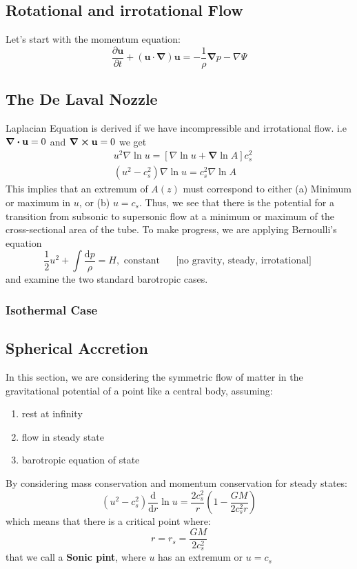 \documentclass[12pt,a4paper]{article}
\begin{document}
\subsection{Rotational and irrotational Flow}
Let's start with the momentum equation:
$$
\frac{\partial \mathbf{u}}{\partial t}+(\mathbf{u} \cdot \boldsymbol{\nabla}) \mathbf{u}=-\frac{1}{\rho} \boldsymbol{\nabla} p-\nabla \Psi
$$

\subsection{The De Laval Nozzle}
Laplacian Equation is derived if we have incompressible and irrotational flow. i.e $\div{\vb{u}=0}$ and $\curl{\vb{u}}=0$
we get $$
\begin{aligned}
& u^2 \nabla \ln u=[\nabla \ln u+\boldsymbol{\nabla} \ln A] c_s^2 \\
& \left(u^2-c_s^2\right) \nabla \ln u=c_s^2 \nabla \ln A
\end{aligned}
$$
This implies that an extremum of $A(z)$ must correspond to either
(a) Minimum or maximum in $u$, or
(b) $u=c_s$.
Thus, we see that there is the potential for a transition from subsonic to supersonic flow at a minimum or maximum of the cross-sectional area of the tube.
To make progress, we are applying Bernoulli's equation
$$
\frac{1}{2} u^2+\int \frac{\mathrm{d} p}{\rho}=H, \text { constant } \quad \text { [no gravity, steady, irrotational] }
$$
and examine the two standard barotropic cases.
\subsubsection{Isothermal Case}


\subsection{Spherical Accretion}
In this section, we are considering the symmetric flow of matter in the gravitational potential of a point like a central body, assuming:
\begin{enumerate}
    \item rest at infinity
    \item flow in steady state
    \item barotropic equation of state
\end{enumerate}
By considering mass conservation and momentum conservation for steady states:
$$
\left(u^2-c_s^2\right) \frac{\mathrm{d}}{\mathrm{d} r} \ln u=\frac{2 c_s^2}{r}\left(1-\frac{G M}{2 c_s^2 r}\right)
$$
which means that there is a critical point where:
$$
r=r_s=\frac{G M}{2 c_s^2}
$$
that we call a \textbf{Sonic pint}, where $u$ has an extremum or $u=c_s$\\
\end{document}
